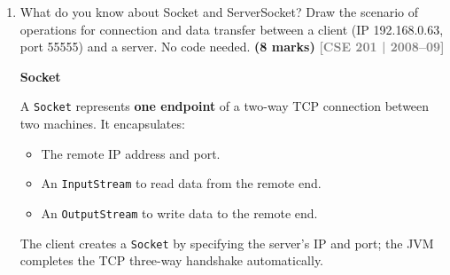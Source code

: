 \documentclass[12pt,a3paper]{article}
\newcommand{\yr}[1]{\hfill\textcolor{gray}{\small\textbf{[#1]}}}
\newcommand{\mk}[1]{\textcolor{orange!70!black}{\small\textbf{(#1 marks)}}}
\begin{document}
\begin{enumerate}
\begin{tcolorbox}
\begin{lstlisting}[language=Java]
        // Thread: read from peer
        Thread reader = new Thread(() -> {
            try {
                String line;
                while ((line = netIn.readLine()) != null)
                    System.out.println("[Peer]: " + line);
            } catch (IOException e) {
                System.out.println("Peer disconnected.");
            }
        });
        reader.setDaemon(true);
        reader.start();

        // Main: type and send
        String msg;
        while ((msg = kbd.readLine()) != null) {
            netOut.println(msg);
            if (msg.equalsIgnoreCase("bye")) break;
        }

        socket.close();
    }
}
\end{lstlisting}

\textbf{Key points:}
\begin{itemize}[itemsep=2pt]
  \item Byte streams (\texttt{InputStream}/
  \texttt{OutputStream}) are wrapped in
  \texttt{BufferedReader} / \texttt{PrintWriter}
  for convenient line-oriented text exchange.
  \item A daemon reader thread handles incoming
  messages concurrently so neither peer blocks
  the other.
  \item Typing \texttt{bye} closes the connection
  gracefully.
\end{itemize}

\end{tcolorbox}

\item What do you know about Socket and ServerSocket? Draw the scenario of operations for connection and data transfer between a client (IP 192.168.0.63, port 55555) and a server. No code needed. \mk{8}
\yr{CSE 201 | 2008--09}

\begin{tcolorbox}[enhanced,breakable,ansbox,
  colback=cB!4,colframe=cB,boxrule=0.8pt,arc=5pt,
  title={\textbf{Answer — Socket, ServerSocket and
  Client-Server Scenario}},
  fonttitle=\bfseries\color{white},colbacktitle=cB]

\textbf{Socket}

A \texttt{Socket} represents \textbf{one endpoint} of a
two-way TCP connection between two machines. It
encapsulates:
\begin{itemize}[itemsep=2pt]
  \item The remote IP address and port.
  \item An \texttt{InputStream} to read data from the
  remote end.
  \item An \texttt{OutputStream} to write data to the
  remote end.
\end{itemize}
The client creates a \texttt{Socket} by specifying the
server's IP and port; the JVM completes the TCP
three-way handshake automatically.


\end{tcolorbox}
\end{enumerate}
\end{document}
